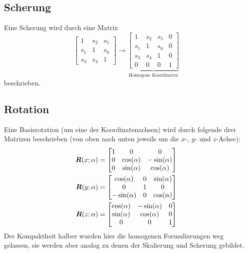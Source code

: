 	\subsection{Scherung}
		Eine Scherung wird durch eine Matrix
		\begin{equation*}
			\begin{bmatrix}
				1   & s_2 & s_5 \\
				s_1 & 1   & s_6 \\
				s_3 & s_4 & 1
			\end{bmatrix}
			\to
			\underbrace{
				\begin{bmatrix}
					1   & s_2 & s_5 & 0 \\
					s_1 & 1   & s_6 & 0 \\
					s_3 & s_4 & 1   & 0 \\
					0   & 0   & 0   & 1
				\end{bmatrix}
			}_\text{Homogene Koordinaten}
		\end{equation*}
		beschrieben.

	\subsection{Rotation}
		Eine Basisrotation (um eine der Koordinatenachsen) wird durch folgende drei Matrizen beschrieben (von oben nach unten jeweils um die \(x\)-, \(y\)- und \(z\)-Achse):
		\begin{align*}
			\bm{R}(x; \alpha) & =
			\begin{bmatrix}
				1 & 0            & 0             \\
				0 & \cos(\alpha) & -\sin(\alpha) \\
				0 & \sin(\alpha) & \cos(\alpha)
			\end{bmatrix} \\
			\bm{R}(y; \alpha) & =
			\begin{bmatrix}
				\cos(\alpha)  & 0 & \sin(\alpha) \\
				0             & 1 & 0            \\
				-\sin(\alpha) & 0 & \cos(\alpha)
			\end{bmatrix} \\
			\bm{R}(z; \alpha) & =
			\begin{bmatrix}
				\cos(\alpha) & -\sin(\alpha) & 0 \\
				\sin(\alpha) & \cos(\alpha)  & 0 \\
				0            & 0             & 1
			\end{bmatrix}
		\end{align*}
		Der Kompaktheit halber wurden hier die homogenen Formulierungen weg gelassen, sie werden aber analog zu denen der Skalierung und Scherung gebildet.

